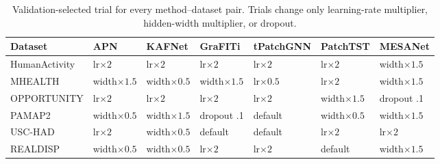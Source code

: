 \begin{table}[H]
\centering
\setlength{\tabcolsep}{4pt}
\caption{Validation-selected trial for every method--dataset pair. Trials
change only learning-rate multiplier, hidden-width multiplier, or dropout.}
\label{tab:v665-selected}
\begin{tabular}{@{}lllllll@{}}
\toprule
Dataset & APN & KAFNet & GraFITi & tPatchGNN & PatchTST & MESANet \\
\midrule
HumanActivity & lr$\times2$ & lr$\times2$ & lr$\times2$ & lr$\times2$ & lr$\times2$ & width$\times1.5$ \\
MHEALTH & width$\times1.5$ & width$\times0.5$ & width$\times1.5$ & lr$\times0.5$ & lr$\times2$ & width$\times1.5$ \\
OPPORTUNITY & lr$\times2$ & lr$\times2$ & lr$\times2$ & lr$\times2$ & width$\times1.5$ & dropout .1 \\
PAMAP2 & width$\times0.5$ & width$\times1.5$ & dropout .1 & default & width$\times0.5$ & width$\times1.5$ \\
USC-HAD & lr$\times2$ & width$\times0.5$ & default & default & lr$\times2$ & lr$\times2$ \\
REALDISP & width$\times0.5$ & width$\times0.5$ & lr$\times2$ & lr$\times2$ & default & width$\times1.5$ \\
\bottomrule
\end{tabular}
\end{table}
